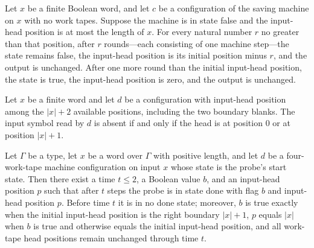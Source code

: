 \begin{theorem}
\label{Turing.recordStep_save_orbit}
\leanok
{}
Let $x$ be a finite Boolean word, and let $c$ be a configuration of the saving machine
on $x$ with no work tapes. Suppose the machine is in state false and the input-head
position is at most the length of $x$. For every natural number $r$ no greater than that
position, after $r$ rounds—each consisting of one machine step—the state remains false,
the input-head position is its initial position minus $r$, and the output is unchanged.
After one more round than the initial input-head position, the state is true, the
input-head position is zero, and the output is unchanged.
\end{theorem}

\begin{theorem}
\label{Turing.recordStep_input_blank}
\leanok
{}
Let $x$ be a finite word and let $d$ be a configuration with input-head position among
the $|x|+2$ available positions, including the two boundary blanks. The input symbol
read by $d$ is absent if and only if the head is at position $0$ or at position $|x|+1$.
\end{theorem}

\begin{theorem}
\label{Turing.recordStep_probe_run}
\leanok
{}
Let $\Gamma$ be a type, let $x$ be a word over $\Gamma$ with positive length, and let
$d$ be a four-work-tape machine configuration on input $x$ whose state is the probe's
start state. Then there exist a time $t\le 2$, a Boolean value $b$, and an input-head
position $p$ such that after $t$ steps the probe is in state done with flag $b$ and
input-head position $p$. Before time $t$ it is in no done state; moreover, $b$ is true
exactly when the initial input-head position is the right boundary $|x|+1$, $p$ equals
$|x|$ when $b$ is true and otherwise equals the initial input-head position, and all
work-tape head positions remain unchanged through time $t$.
\end{theorem}

